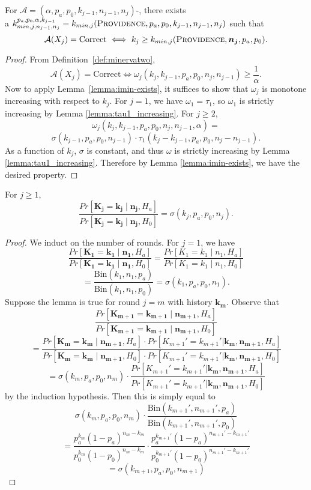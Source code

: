 \begin{lemma}
    \label{lemma:minerva2_kmin_exists}
    For $\mathcal{A}=(\alpha,p_a, p_0,k_{j-1},n_{j-1},n_j)$-\Providence, there exists\\ a 
    $k^{p_a, p_0, \alpha, k_{j-1}}_{min, j, n_{j-1}, n_j}  = 
    k_{min,j}(\textsc{Providence}, p_a, p_0, k_{j-1}, n_{j-1}, n_j)$ such that $$\mathcal{A}(X_j)=\text{Correct}\iff k_j\ge k_{min,j}(\textsc{Providence},  \bm{n_j}, p_a, p_0).$$
\end{lemma}
\begin{proof}
    From Definition~\ref{def:minervatwo}, $$\mathcal{A}(X_j)=\text{Correct}\iff \omega_j(k_{j}, k_{j-1}, p_a, p_0, n_j, n_{j-1}) \ge \frac{1}{\alpha}.$$
    Now to apply Lemma~\ref{lemma:imin-exists}, it suffices to show that
    $\omega_j$ is monotone increasing with respect to $k_j$.
    For $j=1$, we have $\omega_1=\tau_1$, so $\omega_1$ is strictly increasing by Lemma \ref{lemma:tau1_increasing}. For $j\ge 2$,
    $$\omega_j(k_j,k_{j-1},p_a,p_0,n_j,n_{j-1},\alpha)=$$$$\sigma(k_{j-1},p_a,p_0,n_{j-1})\cdot \tau_1(k_{j}-k_{j-1},p_a,p_0,n_j-n_{j-1}).$$
    As a function of $k_j$, $\sigma$ is constant, and thus $\omega$ is strictly increasing by Lemma \ref{lemma:tau1_increasing}. Therefore by Lemma \ref{lemma:imin-exists}, we have the desired property.
\end{proof}

\begin{lemma}
\label{lemma:any_ratio_is_sigma_simple}
For $j\ge 1$,
$$\frac{Pr[\bm{K_j}=\bm{k_j} \mid \bm{n_j}, H_a]}{Pr[\bm{K_j}=\bm{k_j} \mid \bm{n_j}, H_0]} = \sigma(k_j, p_a, p_0, n_j).$$
\end{lemma}
\begin{proof}
We induct on the number of rounds.
For $j=1$, we have
$$\frac{Pr[\bm{K_1}=\bm{k_1} \mid \bm{n_1},H_a]}{Pr[\bm{K_1}=\bm{k_1} \mid  \bm{n_1},H_0]} =\frac{Pr[K_1 = k_{1} \mid n_1,H_a]}{Pr[K_1 = k_1 \mid n_1,H_0]} $$$$= \frac{\text{Bin}(k_1,n_1,p_a)}{\text{Bin}(k_1,n_1,p_0)}=\sigma(k_1, p_a, p_0, n_1).$$
Suppose the lemma is true for round $j=m$ with history $\bm{k_m}$.
Observe that
 $$\frac{Pr[\bm{K_{m+1}}=\bm{k_{m+1}} \mid \bm{n_{m+1}},H_a]}{Pr[\bm{K_{m+1}}=\bm{k_{m+1}} \mid \bm{n_{m+1}}, H_0]} $$$$= \frac{ Pr[\bm{K_{m}}=\bm{k_{m}}\mid \bm{n_{m+1}},H_a] \cdot Pr[K_{m+1}'=k_{m+1}'|\bm{k_m},\bm{n_{m+1}},H_a]}{ Pr[\bm{K_{m}}= \bm{k_{m}} \mid  \bm{n_{m+1}},H_0]  \cdot  Pr[K_{m+1}'=k_{m+1}'|\bm{k_m},\bm{n_{m+1}},H_0]  }$$
 $$=\sigma(k_m, p_a, p_0, n_m) \cdot \frac{Pr[K_{m+1}'=k_{m+1}'|\bm{k_m}, \bm{n_{m+1}}, H_a]}{Pr[K_{m+1}'=k_{m+1}'|\bm{k_m},\bm{n_{m+1}},H_0]}$$
 by the induction hypothesis.
Then this is simply equal to
 $$\sigma(k_m, p_a, p_0, n_m)\cdot\frac{\text{Bin}(k_{m+1}',n_{m+1}',p_a)}{\text{Bin}(k_{m+1}',n_{m+1}',p_0)}
 $$$$
 =\frac{p_a^{k_m} (1-p_a)^{n_m-k_m}}{p_0^{k_m} (1-p_0)^{n_m-k_m}} \cdot
 \frac{p_a^{k_{m+1}'} (1-p_a)^{n_{m+1}'-k_{m+1}'}}{p_0^{k_{m+1}'} (1-p_0)^{n_{m+1}'-k_{m+1}'}}
 $$
 $$
 =\sigma(k_{m+1}, p_a, p_0, n_{m+1})
 $$
\end{proof}


